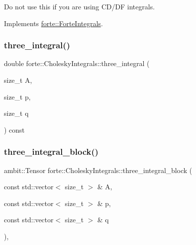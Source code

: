Do not use this if you are using C\+D/\+DF integrals. 



Implements \mbox{\hyperlink{classforte_1_1_forte_integrals_aaccd56e90bbc3c423158efb154336b9c}{forte\+::\+Forte\+Integrals}}.

\mbox{\label{classforte_1_1_cholesky_integrals_aba0bbed773557a5cce05d50e23d03c82}} 
\subsubsection{\texorpdfstring{three\+\_\+integral()}{three\_integral()}}
{\footnotesize\ttfamily double forte\+::\+Cholesky\+Integrals\+::three\+\_\+integral (\begin{DoxyParamCaption}\item[{size\+\_\+t}]{A,  }\item[{size\+\_\+t}]{p,  }\item[{size\+\_\+t}]{q }\end{DoxyParamCaption}) const}

\mbox{\label{classforte_1_1_cholesky_integrals_a73dccc944cd9fdb00626bc88390136bf}} 
\subsubsection{\texorpdfstring{three\+\_\+integral\+\_\+block()}{three\_integral\_block()}}
{\footnotesize\ttfamily ambit\+::\+Tensor forte\+::\+Cholesky\+Integrals\+::three\+\_\+integral\+\_\+block (\begin{DoxyParamCaption}\item[{const std\+::vector$<$ size\+\_\+t $>$ \&}]{A,  }\item[{const std\+::vector$<$ size\+\_\+t $>$ \&}]{p,  }\item[{const std\+::vector$<$ size\+\_\+t $>$ \&}]{q }\end{DoxyParamCaption})\hspace{0.3cm}{\ttfamily [override]}, {\ttfamily [virtual]}}



